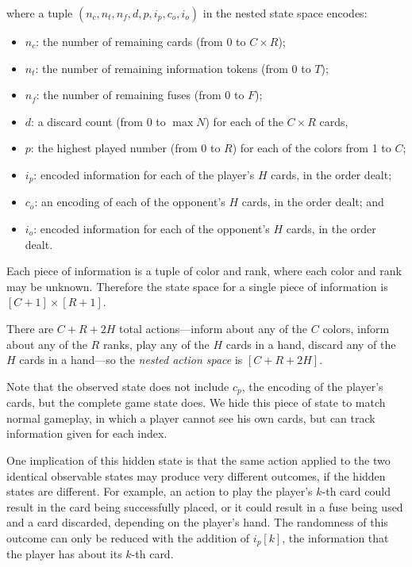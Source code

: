 where a tuple $(n_c, n_t, n_f, d, p, i_p, c_o, i_o)$ in the nested state space
encodes:
\begin{itemize}
  \setlength\itemsep{0em}
  \item $n_c$: the number of remaining cards (from 0 to $C \times R$);
  \item $n_t$: the number of remaining information tokens (from 0 to $T$);
  \item $n_f$: the number of remaining fuses (from 0 to $F$);
  \item $d$: a discard count (from 0 to $\max{N}$) for each of the $C \times R$
      cards,
  \item $p$: the highest played number (from 0 to $R$) for each of the colors
      from 1 to $C$;
  \item $i_p$: encoded information for each of the player's $H$ cards, in the
      order dealt;
  \item $c_o$: an encoding of each of the opponent's $H$ cards, in the order
      dealt; and
  \item $i_o$: encoded information for each of the opponent's $H$ cards, in the
      order dealt.
\end{itemize}
Each piece of information is a tuple of color and rank, where each color and
rank may be unknown. Therefore the state space for a single piece of
information is $[C + 1] \times [R + 1]$.

There are $C + R + 2H$ total actions---inform about any of the $C$ colors,
inform about any of the $R$ ranks, play any of the $H$ cards in a hand, discard
any of the $H$ cards in a hand---so the \emph{nested action space} is $[C + R +
2H]$.

Note that the observed state does not include $c_p$, the encoding of the
player's cards, but the complete game state does. We hide this piece of state
to match normal gameplay, in which a player cannot see his own cards, but can
track information given for each index.

One implication of this hidden state is that the same action applied to the two
identical observable states may produce very different outcomes, if the hidden
states are different. For example, an action to play the player's $k$-th card
could result in the card being successfully placed, or it could result in a
fuse being used and a card discarded, depending on the player's hand. The
randomness of this outcome can only be reduced with the addition of $i_p[k]$, the
information that the player has about its $k$-th card.

